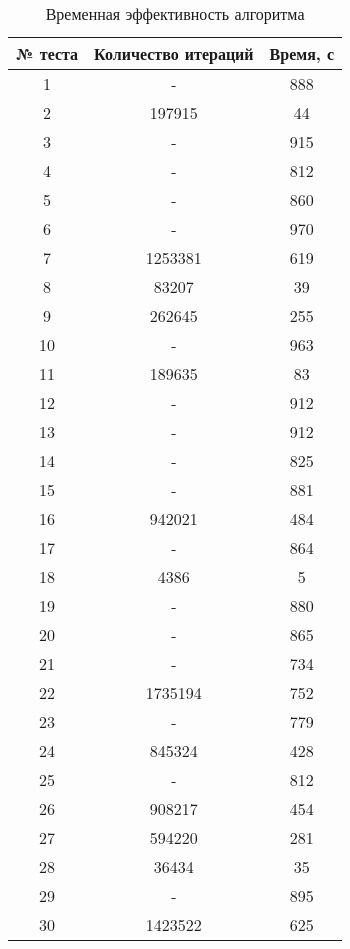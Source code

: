 \begin{table}[ht!]
	\centering
	\caption{Временная эффективность алгоритма}
	\label{BigResults1}
	\begin{tabular}{|c|c|c|}
		\hline
		№ теста & Количество итераций & Время, с \\ \hline
		1       & -                   & 888      \\ \hline
		2       & 197915              & 44       \\ \hline
		3       & -                   & 915      \\ \hline
		4       & -                   & 812      \\ \hline
		5       & -                   & 860      \\ \hline
		6       & -                   & 970      \\ \hline
		7       & 1253381             & 619      \\ \hline
		8       & 83207               & 39       \\ \hline
		9       & 262645              & 255      \\ \hline
		10      & -                   & 963      \\ \hline
		11      & 189635              & 83       \\ \hline
		12      & -                   & 912      \\ \hline
		13      & -                   & 912      \\ \hline
		14      & -                   & 825      \\ \hline
		15      & -                   & 881      \\ \hline
		16      & 942021              & 484      \\ \hline
		17      & -                   & 864      \\ \hline
		18      & 4386                & 5        \\ \hline
		19      & -                   & 880      \\ \hline
		20      & -                   & 865      \\ \hline
		21      & -                   & 734      \\ \hline
		22      & 1735194             & 752      \\ \hline
		23      & -                   & 779      \\ \hline
		24      & 845324              & 428      \\ \hline
		25      & -                   & 812      \\ \hline
		26      & 908217              & 454      \\ \hline
		27      & 594220              & 281      \\ \hline
		28      & 36434               & 35       \\ \hline
		29      & -                   & 895      \\ \hline
		30      & 1423522             & 625      \\ \hline
	\end{tabular}
\end{table}
